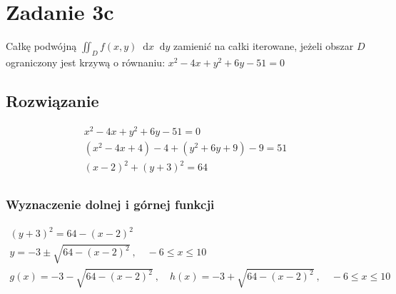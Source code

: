 \documentclass{article}
\newcommand{\diff}{\mathop{}\!\mathrm{d}}
\DeclareMathOperator{\?}{?}
\begin{document}
\section*{Zadanie 3c}
Całkę podwójną $\displaystyle \iint_D f(x,y) \diff{x}\diff{y}$ zamienić na całki
iterowane, jeżeli obszar $D$ ograniczony jest krzywą o równaniu: $x^2 - 4x + y^2 + 6y - 51 = 0$

\subsection*{Rozwiązanie}

\begin{figure}[h!]
   \centering
\end{figure}

\begin{equation*}
   \begin{gathered}
      x^2 - 4x + y^2 + 6y - 51 = 0 \\
      (x^2 - 4x + 4) - 4 + (y^2 + 6y + 9) - 9 = 51 \\
      (x - 2)^2 + (y + 3)^2 = 64 \\
   \end{gathered}
\end{equation*}

\subsubsection*{Wyznaczenie dolnej i górnej funkcji}

\begin{equation*}
   \begin{gathered}
      (y + 3)^2 = 64 - (x - 2)^2 \\
      y = -3 \pm \sqrt{64 - (x - 2)^2}\ , \quad -6 \le x \le 10 \\
      g(x) = -3 - \sqrt{64 - (x - 2)^2}\ , \quad h(x) = -3 + \sqrt{64 - (x - 2)^2}\ , \quad -6 \le x \le 10 \\
   \end{gathered}
\end{equation*}
\end{document}
